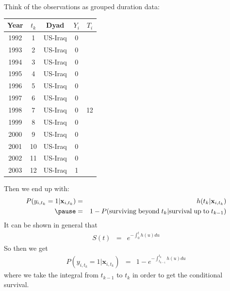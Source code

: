 \documentclass[handout]{beamer}
\begin{document}
\begin{frame}
Think of the observations as grouped duration data:
\pause
\begin{table}
\begin{center}
\begin{tabular}{|c|c|c|c|c|}
\hline
Year & $t_k$ & Dyad & $Y_i$ & $T_i$\\
\hline
1992 & 1 & US-Iraq & 0 & \\
1993 & 2 & US-Iraq & 0 & \\
1994 & 3 & US-Iraq & 0 & \\
1995 & 4 & US-Iraq & 0 & \\
1996 & 5 & US-Iraq & 0 & \\
1997 & 6 & US-Iraq & 0 & \\
1998 & 7 & US-Iraq & 0 & 12\\
1999 & 8 & US-Iraq & 0 & \\
2000 & 9 & US-Iraq & 0 & \\
2001 & 10 & US-Iraq & 0 & \\
2002 & 11 & US-Iraq & 0 & \\
2003 & 12 & US-Iraq & 1 & \\
\hline
\end{tabular}
\end{center}
\end{table}
\end{frame}

\begin{frame}
Then we end up with:
\begin{eqnarray*}
P(y_{i,t_k} = 1 | \mathbf{x}_{i,t_k}) &=& h(t_k | \mathbf{x}_{i,t_k}) \\
\pause
&=& 1 - P(\mathrm{surviving \;  beyond} \; t_k | \mathrm{survival \;
up \; to} \; t_{k-1})
\end{eqnarray*}
\pause
It can be shown in general that 
\begin{eqnarray*}
S(t) &=& e^{-\int_0^t h(u) du}
\end{eqnarray*}
\pause
So then we get
\begin{eqnarray*}
P(y_{i,t_k} = 1 | \mathbf{x}_{i,t_k}) &=& 1 -  e^{-\int_{t_{k-1}}^{t_k} h(u) du}
\end{eqnarray*}
where we take the integral from $t_{k-1}$ to $t_k$ in order to get the
conditional survival.
\end{frame}
\end{document}
